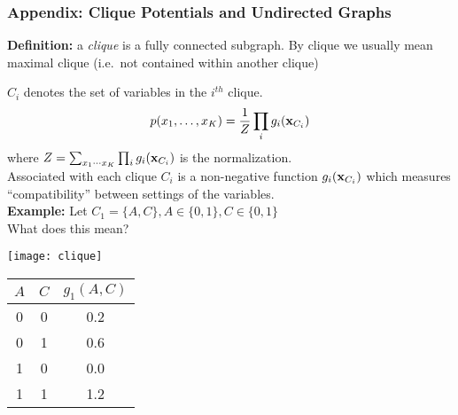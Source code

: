 \begin{frame}
\frametitle{Appendix: Clique Potentials and Undirected Graphs}

\vspace{-1ex}
{\bf Definition:} a \emph{clique} is a fully connected subgraph. By clique we usually mean maximal clique (i.e.\ not contained within another clique)\\[1ex]

\parbox{3.3in}{
$C_i$ denotes the set of variables in the $i^{th}$ clique.
\[ p(x_1,\ldots,x_K)=\frac{1}{Z}\prod_i g_i({\bf x}_{C_i})\] where
$ Z=\sum_{x_1\cdots x_K}\prod_i g_i({\bf x}_{C_i}) $ is the normalization.\\

Associated with each clique $C_i$ is a non-negative function $g_i({\bf
x}_{C_i})$  which measures ``compatibility'' between settings of  the
variables. \\

{\bf Example:} Let $C_1 = \{A,C\}, A \in \{0,1\}, C \in \{0,1\}$ \\
What does this mean?
}
\parbox{1.8in}{
\centerline{\texttt{[image: clique]}}

\vspace{3ex}

\begin{center}
\begin{tabular}{cc|c}
$A$ & $C$ & $g_1(A,C)$ \\ \hline
0 & 0 & 0.2 \\
0 & 1 & 0.6 \\
1 & 0 & 0.0 \\
1 & 1 & 1.2 
\end{tabular}
\end{center}
}


\end{frame}
